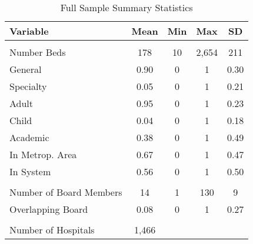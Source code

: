 \begin{table}[ht!]

\caption{Full Sample Summary Statistics\label{all_sumstats}}
\centering
\begin{tabular}[t]{lcccc}
\toprule
Variable & Mean & Min & Max & SD\\
\midrule
\addlinespace[0.3em]
\multicolumn{5}{l}{\textbf{Characteristics}}\\
\hspace{1em}Number Beds & 178 & 10 & 2,654 & 211\\
\hspace{1em}General & 0.90 & 0 & 1 & 0.30\\
\hspace{1em}Specialty & 0.05 & 0 & 1 & 0.21\\
\hspace{1em}Adult & 0.95 & 0 & 1 & 0.23\\
\hspace{1em}Child & 0.04 & 0 & 1 & 0.18\\
\hspace{1em}Academic & 0.38 & 0 & 1 & 0.49\\
\hspace{1em}In Metrop. Area & 0.67 & 0 & 1 & 0.47\\
\hspace{1em}In System & 0.56 & 0 & 1 & 0.50\\
\addlinespace[0.3em]
\multicolumn{5}{l}{\textbf{Board Characteristics}}\\
\hspace{1em}Number of Board Members & 14 & 1 & 130 & 9\\
\hspace{1em}Overlapping Board & 0.08 & 0 & 1 & 0.27\\
\\
Number of Hospitals & 1,466 &  &  & \\
\bottomrule
\end{tabular}
\end{table}
